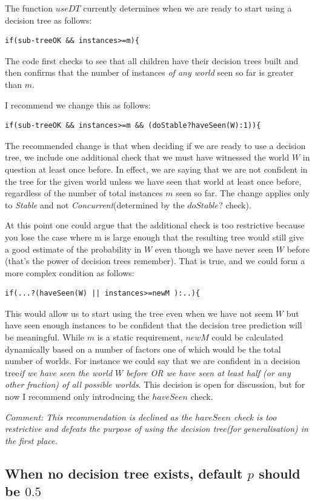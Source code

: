 \documentclass[a4paper]{article}
\newcommand{\cc}{\emph{Concurrent}\xspace}
\newcommand{\st}{\emph{Stable}\xspace}
\newcommand{\dt}{{decision tree}\xspace}
\begin{document}
The function $useDT$ currently determines when we are ready to start using a \dt as follows:
\begin{verbatim}
if(sub-treeOK && instances>=m){
\end{verbatim}
The code first checks to see that all children have their {\dt}s built and then confirms that the number of instances \emph{of any world} seen so far is greater than $m$.

I recommend we change this as follows:
\begin{verbatim}
if(sub-treeOK && instances>=m && (doStable?haveSeen(W):1)){
\end{verbatim}
The recommended change is that when deciding if we are ready to use a \dt, we include one additional check that we must have witnessed the world $W$ in question at least once before. In effect, we are saying that we are not confident in the tree for the given world unless we have seen that world at least once before, regardless of the number of total instances $m$ seen so far. The change applies only to \st and not \cc (determined by the $doStable?$ check).

At this point one could argue that the additional check is too restrictive because you lose the case where m is large enough that the resulting tree would still give a good estimate of the probability in $W$ even though we have never seen $W$ before (that's the power of {\dt}s remember). That is true, and we could form a more complex condition as follows:
\begin{verbatim}
if(...?(haveSeen(W) || instances>=newM ):..){
\end{verbatim}
This would allow us to start using the tree even when we have not seem $W$ but have seen enough instances to be confident that the \dt prediction will be meaningful. While $m$ is a static requirement, $newM$ could be calculated dynamically based on a number of factors one of which would be the total number of worlds. For instance we could say that we are confident in a \dt \emph{if we have seen the world $W$ before OR we have seen at least half (or any other fraction) of all possible worlds}. This decision is open for discussion, but for now I recommend only introducing the $haveSeen$ check.

\textit{Comment: This recommendation is declined as the $haveSeen$ check is too restrictive and defeats the purpose of using the \dt (for generalisation) in the first place.}

\subsection{When no \dt exists, default $p$ should be $0.5$}
\label{subsec:use-p-05}
\end{document}
